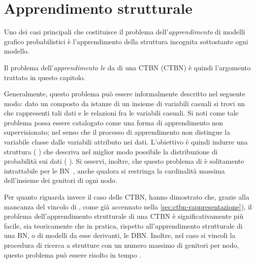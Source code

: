 
\chapter{Apprendimento strutturale}\label{cap:structurallearning}
Uno dei casi principali che costituisce il problema dell'\emph{apprendimento} di modelli grafico probabilistici è l'apprendimento della struttura incognita sottostante ogni modello.

Il problema dell'\emph{apprendimento le} da \emph{} di una \acl{CTBN} (\acs{CTBN}) è quindi l'argomento trattato in questo capitolo.

Generalmente, questo problema può essere informalmente descritto nel seguente modo: dato un  composto da istanze di un insieme di variabili casuali si trovi un  che rappresenti tali dati e le relazioni fra le variabili casuali. Si noti come tale problema possa essere catalogato come una forma di apprendimento non supervisionato; nel senso che il processo di apprendimento non distingue la variabile classe dalle variabili attributo nei dati. L'obiettivo è quindi indurre una struttura (\ie{} ) che descriva nel miglior modo possibile la distribuzione di probabilità sui dati (\ie{} \emph{}). Si osservi, inoltre, che questo problema di  è solitamente intrattabile per le \acl{BN}~\citep{Chickering1994,Chickering2004}, anche qualora si restringa la cardinalità massima dell'insieme dei genitori di ogni nodo.

Per quanto riguarda invece il caso delle \acs{CTBN}, \citet{Nodelman2002} hanno dimostrato che, grazie alla mancanza del vincolo di , come già accennato nella \autoref{sec:ctbn-rappresentazione}), il problema dell'apprendimento strutturale di una \acs{CTBN} è significativamente più facile, sia teoricamente che in pratica, rispetto all'apprendimento strutturale di una \acl{BN}, o di modelli da esse derivanti, \eg{} le \acf{DBN}. Inoltre, nel caso si vincoli la procedura di ricerca a strutture con un numero massimo di genitori per nodo, questo problema può essere risolto in tempo .

